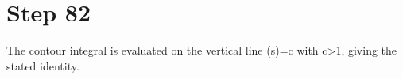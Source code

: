 \section*{Step 82}

The contour integral is evaluated on the vertical line \Re(s)=c with c>1, giving the stated identity.

